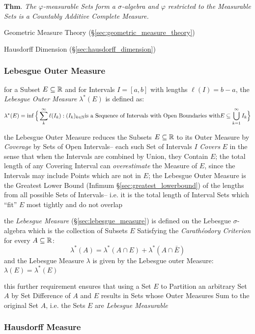 $\textbf{Thm.}$ \emph{
  The $\varphi$-measurable Sets form a $\sigma$-algebra and $\varphi$ restricted
  to the Measurable Sets is a Countably Additive Complete Measure.
}

Geometric Measure Theory (\S\ref{sec:geometric_measure_theory})

Hausdorff Dimension (\S\ref{sec:hausdorff_dimension})



\subsubsection{Lebesgue Outer Measure}\label{sec:lebesgue_outer_measure}

for a Subset $E \subseteq \mathbb{R}$ and for Intervals $I = [a,b]$ with lengths
$\ell(I) = b-a$, the \emph{Lebesgue Outer Measure} $\lambda^*(E)$ is defined as:
\[
  \lambda^*(E) = \inf \Big\{ \sum_k^\infty \ell(I_k) : (I_k)_{k \in \mathbb{N}}
    \text{is a Sequence of Intervals with Open Boundaries with}
    E \subseteq \bigcup_{k=1}^\infty I_k \Big\}
\]

the Lebesgue Outer Measure reduces the Subsets $E \subseteq \mathbb{R}$ to its Outer
Measure by \emph{Coverage} by Sets of Open Intervals-- each such Set of
Intervals $I$ \emph{Covers} $E$ in the sense that when the Intervals are
combined by Union, they Contain $E$; the total length of any Covering Interval
can \emph{overestimate} the Measure of $E$, since the Intervals may include
Points which are not in $E$; the Lebesgue Outer Measure is the Greatest Lower
Bound (Infimum \S\ref{sec:greatest_lowerbound}) of the lengths from all possible
Sets of Intervals-- i.e. it is the total length of Interval Sets which ``fit''
$E$ most tightly and do not overlap

the \emph{Lebesgue Measure} (\S\ref{sec:lebesgue_measure}) is defined on the
Lebesgue $\sigma$-algebra which is the collection of Subsets $E$ Satisfying the
\emph{Carath\'eodory Criterion} for every $A \subseteq \mathbb{R}$:
\[
  \lambda^*(A) = \lambda^*(A \cap E) + \lambda^*(A \cap \bar{E})
\]
and the Lebesgue Measure $\lambda$ is given by the Lebesgue outer Measure:
$\lambda(E) = \lambda^*(E)$

this further requirement ensures that using a Set $E$ to Partition an arbitrary
Set $A$ by Set Difference of $A$ and $E$ results in Sets whose Outer Measures
Sum to the original Set $A$, i.e. the Sets $E$ are \emph{Lebesgue Measurable}



\subsubsection{Hausdorff Measure}\label{sec:hausdorff_measure}

